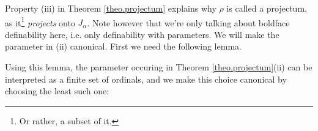 
Property (iii) in Theorem \ref{theo.projectum} explains why $\rho$ is called a projectum, as it\footnote{Or rather, a subset of it.} \textit{projects} onto $J_\alpha$. Note however that we're only talking about boldface definability here, i.e. only definability with parameters. We will make the parameter in (ii) canonical. First we need the following lemma.


Using this lemma, the parameter occuring in Theorem \ref{theo.projectum}(ii) can be interpreted as a finite set of ordinals, and we make this choice canonical by choosing the least such one:

